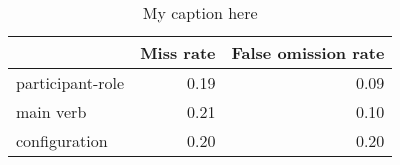 \begin{table}[!ht]
\centering
\begin{tabular}{lrr}
\toprule
{} &  Miss rate &  False omission rate \\
\midrule
participant-role &       0.19 &                 0.09 \\
main verb        &       0.21 &                 0.10 \\
configuration    &       0.20 &                 0.20 \\
\bottomrule
\end{tabular}
\caption{My caption here}
\label{tab:unit-elements-transitivity-exact-errors}
\end{table}
